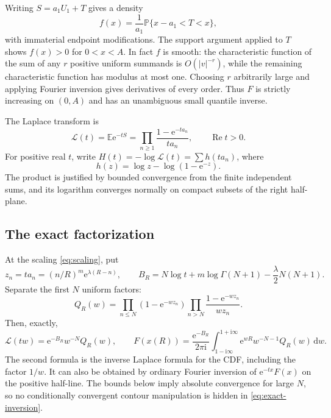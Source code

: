 \documentclass[11pt,a4paper]{article}
\numberwithin{equation}{section}
\theoremstyle{definition}
\newcommand{\E}{\mathbb E}
\newcommand{\Prob}{\mathbb P}
\newcommand{\dd}{\,\mathrm d}
\newcommand{\ii}{\mathrm i}
\newcommand{\ee}{\mathrm e}
\newcommand{\calL}{\mathcal L}
\begin{document}
Writing $S=a_1U_1+T$ gives a density
\[
 f(x)=\frac1{a_1}\Prob\{x-a_1<T<x\},
\]
with immaterial endpoint modifications. The support argument applied to $T$ shows $f(x)>0$ for $0<x<A$. In fact $f$ is smooth: the characteristic function of the sum of any $r$ positive uniform summands is $O(|v|^{-r})$, while the remaining characteristic function has modulus at most one. Choosing $r$ arbitrarily large and applying Fourier inversion gives derivatives of every order. Thus $F$ is strictly increasing on $(0,A)$ and has an unambiguous small quantile inverse.

The Laplace transform is
\begin{equation}
 \calL(t)=\E\ee^{-tS}
 =\prod_{n\geq1}\frac{1-\ee^{-ta_n}}{ta_n},\qquad \operatorname{Re}t>0.
 \label{eq:laplace}
\end{equation}
For positive real $t$, write $H(t)=-\log\calL(t)=\sum h(ta_n)$, where
\begin{equation}
 h(z)=\log z-\log(1-\ee^{-z}).
 \label{eq:h}
\end{equation}
The product is justified by bounded convergence from the finite independent sums, and its logarithm converges normally on compact subsets of the right half-plane.

\subsection{The exact factorization}
At the scaling \eqref{eq:scaling}, put
\begin{equation}
 z_n=ta_n=(n/R)^m\ee^{\lambda(R-n)},
 \qquad
 B_R=N\log t+m\log\Gamma(N+1)-\frac\lambda2N(N+1).
 \label{eq:zB}
\end{equation}
Separate the first $N$ uniform factors:
\begin{equation}
 Q_R(w)=\prod_{n\leq N}(1-\ee^{-wz_n})
 \prod_{n>N}\frac{1-\ee^{-wz_n}}{wz_n}.
 \label{eq:QR}
\end{equation}
Then, exactly,
\begin{equation}
 \calL(tw)=\ee^{-B_R}w^{-N}Q_R(w),
 \qquad
 F(x(R))=\frac{\ee^{-B_R}}{2\pi\ii}
 \int_{1-\ii\infty}^{1+\ii\infty}
 \ee^{wR}w^{-N-1}Q_R(w)\dd w.
 \label{eq:exact-inversion}
\end{equation}
The second formula is the inverse Laplace formula for the CDF, including the factor $1/w$. It can also be obtained by ordinary Fourier inversion of $\ee^{-tx}F(x)$ on the positive half-line. The bounds below imply absolute convergence for large $N$, so no conditionally convergent contour manipulation is hidden in \eqref{eq:exact-inversion}.
\end{document}
